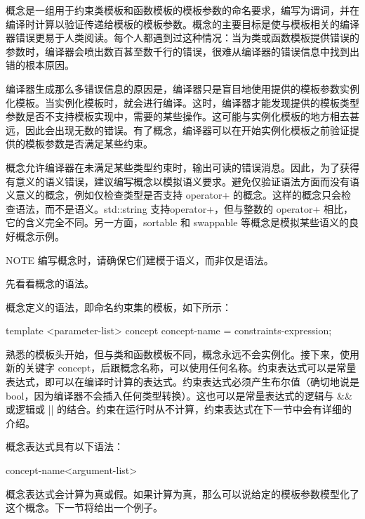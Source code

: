 
概念是一组用于约束类模板和函数模板的模板参数的命名要求，编写为谓词，并在编译时计算以验证传递给模板的模板参数。概念的主要目标是使与模板相关的编译器错误更易于人类阅读。每个人都遇到过这种情况：当为类或函数模板提供错误的参数时，编译器会喷出数百甚至数千行的错误，很难从编译器的错误信息中找到出错的根本原因。

编译器生成那么多错误信息的原因是，编译器只是盲目地使用提供的模板参数实例化模板。当实例化模板时，就会进行编译。这时，编译器才能发现提供的模板类型参数是否不支持模板实现中，需要的某些操作。这可能与实例化模板的地方相去甚远，因此会出现无数的错误。有了概念，编译器可以在开始实例化模板之前验证提供的模板参数是否满足某些约束。

概念允许编译器在未满足某些类型约束时，输出可读的错误消息。因此，为了获得有意义的语义错误，建议编写概念以模拟语义要求。避免仅验证语法方面而没有语义意义的概念，例如仅检查类型是否支持 operator+ 的概念。这样的概念只会检查语法，而不是语义。std::string 支持operator+，但与整数的 operator+ 相比，它的含义完全不同。另一方面，sortable 和 swappable 等概念是模拟某些语义的良好概念示例。

\begin{myNotic}{NOTE}
编写概念时，请确保它们建模于语义，而非仅是语法。
\end{myNotic}

先看看概念的语法。


概念定义的语法，即命名约束集的模板，如下所示：

\begin{cpp}
template <parameter-list>
concept concept-name = constraints-expression;
\end{cpp}

熟悉的模板头开始，但与类和函数模板不同，概念永远不会实例化。接下来，使用新的关键字 concept，后跟概念名称，可以使用任何名称。约束表达式可以是常量表达式，即可以在编译时计算的表达式。约束表达式必须产生布尔值（确切地说是 bool，因为编译器不会插入任何类型转换）。这也可以是常量表达式的逻辑与 \&\& 或逻辑或 || 的结合。约束在运行时从不计算，约束表达式在下一节中会有详细的介绍。

概念表达式具有以下语法：

\begin{cpp}
concept-name<argument-list>
\end{cpp}

概念表达式会计算为真或假。如果计算为真，那么可以说给定的模板参数模型化了这个概念。下一节将给出一个例子。


